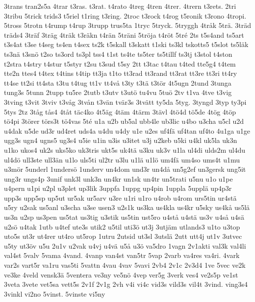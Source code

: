 {3trans
tran2s5a
4trar
t3ras.
t3rat.
t4rato
4treg
4tren
4trer.
4trern
t3rets.
2tri
3tribu
5trick
trids3
t5riel
t1ring
t3ring.
2troc
t3rock
t4rog
t5ronik
t3rono
4tropi.
5tross
5trotn
t4rump
t4rup
3trupp
trus5ta
1tryc
5tryck.
5tryggh
4tr^^e5k
5tr^^e4.
3tr^^e4d
tr^^e4ds4
3tr^^e4f
3tr^^e4g
4tr^^e4k
t3r^^e4kn
t4r^^e4n
5tr^^e4ni
5tr^^f6ja
t4r^^f6t
5tr^^e9
2ts
t5s4and
ts5art
t3s4at
t3se
t4seg
ts4en
t4sex
ts2k
t5skall
t3skatt
t1ski
ts3kl
tskotts5
t5slot
ts5l^^e4k
ts3n^^e4
t3sn^^f6
t2so
ts3ord
ts3pl
tss4
t1st
ts4te
ts5ter
ts5tillf
ts3tj
t3stol
t4ston
t2stra
t4stry
t4stur
t5styr
t2su
t3sud
t5sy
2tt
t3tac
t4tau
t4ted
tte5g4
t4tem
tte2n
ttes4
t4tex
t4tins
t4tip
tt3ja
t1to
tt3rad
tt3rand
tt3rat
tt3re
tt3ri
tt4ry
tt4se
tt2si
tt4sta
t3tu
t4tug
tt1v
tt4v^^e5
t3ty
t3t^^e4
t3t^^f6r
4t5ugn
2tund
3tunga
tung3s
5tunn
2tupp
tu5re
2tutb
t3utv
t3ut^^f6
tu4vu
5tu^^f6
2tv
t1va
4tve
t3vig
3tving
t3vit
3tviv
t3v^^e5g
3tv^^e5n
t3v^^e4n
tv^^e4r3s
3tv^^e4tt
ty5da
5tyg.
3tyngd
3typ
ty3pi
5tys
2tz
3t^^e5g
t^^e5s4
4t^^e5t
t^^e4c4ko
4t5^^e4g
4t^^e4m
4t^^e4rm
3t^^e4vl
4t^^f64d
t^^f65de
4t^^f6g
4t^^f6p
t^^f64pi
3t^^f6rer
t^^f6rs3t
t^^f64vas
5t^^e9
u1a
u2b
ub5al
ubb4le
ub3lic
u4bo
u3cha
u5cl
u2d
u4dak
u5de
ud3r
ud4ret
uds4a
u4du
u4dy
u1e
u2es
uf4f^^e4
uf4tan
uf4to
4u1ga
u1ge
ugg3s
ugn4
ugns5
ug3s4
u5ie
u1in
u3is
u3itet
u3j
u2keb
u5ki
u4kl
uk5la
uk3n
u1ko
ukos4
uk2s
uks5ko
uk3tris
ukt5s
uk4t^^e4
u3ku
uk3v
u1la
ul4di
ulds2m
ul4du
ul4d^^f6
ull3ste
ull3^^e4n
u1lo
uls5ti
ul2tr
u3lu
u1l^^e4
u1l^^f6
um4f^^e4
um4so
ums4t
u1mu
u3m^^f6r
5underl
1unders^^f6
1underv
un4dom
und3r
un4d^^e5
un5g2ef
un3gersk
ung5it
ung3r
ungs4p
3unif
unk3l
unk3n
un4kr
un1sk
un4tr
un5trati
u5nu
u1o
u1pe
u4pern
u1pi
u2pl
u3plet
up3lik
3uppfa
1uppg
up4pin
1uppla
5uppl^^e4
up4p3r
upp3s
upp5sp
up5ut
ur5ak
ur5arv
u3re
u1ri
u1ro
u4rob
u4rom
urs5tin
ur4st^^e4
u5ry
u2sak
us5anl
u3scha
u3se
usen3
u2s1k
us3ka
us4kla
us4kr
u5sky
us4k^^e5
us5l^^e4
us3n
u2sp
us3pen
us5tat
us3tig
u3stik
us5tin
ust5ro
u4st^^e5
u4st^^e4
us3v
u4s^^e5
u4s^^e4
u2s^^f6
u4tak
1utb
u4tef
ute3s
utik2
u5til
uti3^^f6
ut3j
3utj^^e4m
utlands3
u1to
u3top
uto5s
ut3r
ut4rer
ut4ro
ut5rop
1utru
2utsid
ut3sl
3utsl^^e4
2utt
utt4j
ut1v
3utvec
u5ty
ut3^^f6v
u5u
2u1v
u2vak
u4vj
u4v^^e4
u5^^e5
u3^^f6
va5dro
1vagn
2v1akti
val3k
val4li
val4st
5valv
5vama
4vand.
4vanp
van4st
van5tr
5vap
2varb
va4res
va4ri.
4vark
var2s
vart5r
va1ru
vas5ti
5vattn
4vau
4vav
5vavi
2vb4
2v1c
2v3d4
1ve
5vec
ve2k
ve3ke
4veld
vensk3^^e4
5ventera
ve3ny
ve5n^^f6
4vep
ver5g
3verk
ves4
ve2s5p
ve1st
3veta
3vete
vet5sa
vett5s
2v1f
2v1g
2vh
v4i
vi4c
vid3s
vild3s
vil4t
3vind.
ving3s4
3vinkl
vi2no
5vinst.
5vinste
vi5ny
}
